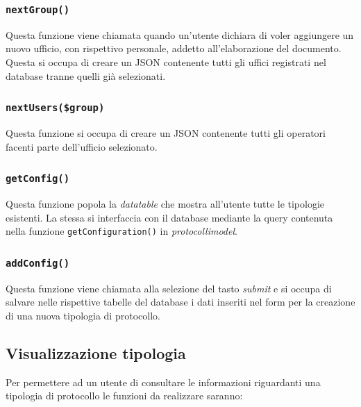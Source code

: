     \subsubsection{\texttt{nextGroup()}}
    Questa funzione viene chiamata quando un'utente dichiara di voler aggiungere un nuovo ufficio, con rispettivo personale, addetto all'elaborazione del documento. 
    \\
    Questa si occupa di creare un JSON contenente tutti gli uffici registrati nel database tranne quelli già selezionati.
    
    \subsubsection{\texttt{nextUsers(\$group)}}
    Questa funzione si occupa di creare un JSON contenente tutti gli operatori facenti parte dell'ufficio selezionato.
    
    \subsubsection{\texttt{getConfig()}}
    Questa funzione popola la \textit{datatable} che mostra all'utente tutte le tipologie esistenti. La stessa si interfaccia con il database mediante la query contenuta nella funzione \texttt{getConfiguration()} in \textit{protocollimodel}.
    
    \subsubsection{\texttt{addConfig()}}
    Questa funzione viene chiamata alla selezione del tasto \textit{submit} e si occupa di salvare nelle rispettive tabelle del database i dati inseriti nel form per la creazione di una nuova tipologia di protocollo.
    
    \subsection{Visualizzazione tipologia}
    Per permettere ad un utente di consultare le informazioni riguardanti una tipologia di protocollo le funzioni da realizzare saranno:
    
